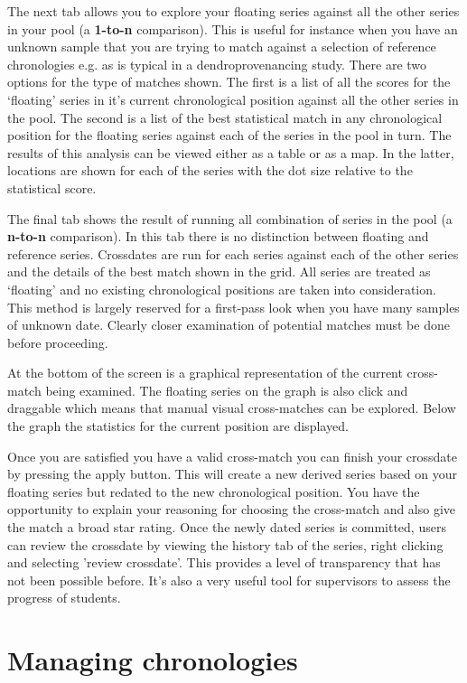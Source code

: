 The next tab allows you to explore your floating series against all the other series in your pool (a \textbf{1-to-n} comparison).  This is useful for instance when you have an unknown sample that you are trying to match against a selection of reference chronologies e.g. as is typical in a dendroprovenancing study.  There are two options for the type of matches shown.  The first is a list of all the scores for the `floating' series in it's current chronological position against all the other series in the pool.  The second is a list of the best statistical match in any chronological position for the floating series against each of the series in the pool in turn.  The results of this analysis can be viewed either as a table or as a map.  In the latter, locations are shown for each of the series with the dot size relative to the statistical score.

The final tab shows the result of running all combination of series in the pool (a \textbf{n-to-n} comparison).  In this tab there is no distinction between floating and reference series.  Crossdates are run for each series against each of the other series and the details of the best match shown in the grid.  All series are treated as `floating' and no existing chronological positions are taken into consideration.  This method is largely reserved for a first-pass look when you have many samples of unknown date.  Clearly closer examination of potential matches must be done before proceeding.

At the bottom of the screen is a graphical representation of the current cross-match being examined.  The floating series on the graph is also click and draggable which means that manual visual cross-matches can be explored.  Below the graph the statistics for the current position are displayed.

Once you are satisfied you have a valid cross-match you can finish your crossdate by pressing the apply button.  This will create a new derived series based on your floating series but redated to the new chronological position.  You have the opportunity to explain your reasoning for choosing the cross-match and also give the match a broad star rating.  Once the newly dated series is committed, users can review the crossdate by viewing the history tab of the series, right clicking and selecting 'review crossdate'.  This provides a level of transparency that has not been possible before.  It's also a very useful tool for supervisors to assess the progress of students.


\section{Managing chronologies}

